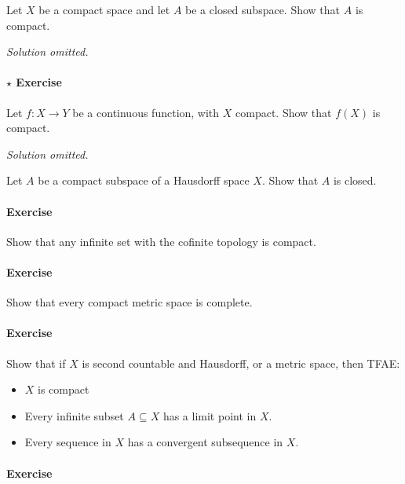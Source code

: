 Let \(X\) be a compact space and let \(A\) be a closed subspace. Show
that \(A\) is compact.

\emph{Solution omitted.}

\hypertarget{star-exercise-1}{%
\paragraph{\texorpdfstring{\(\star\)
Exercise}{\textbackslash star Exercise}}\label{star-exercise-1}}

Let \(f : X \to Y\) be a continuous function, with \(X\) compact. Show
that \(f(X)\) is compact.

\emph{Solution omitted.}

Let \(A\) be a compact subspace of a Hausdorff space \(X\). Show that
\(A\) is closed.

\hypertarget{exercise-13}{%
\paragraph{Exercise}\label{exercise-13}}

Show that any infinite set with the cofinite topology is compact.

\hypertarget{exercise-14}{%
\paragraph{Exercise}\label{exercise-14}}

Show that every compact metric space is complete.

\hypertarget{exercise-15}{%
\paragraph{Exercise}\label{exercise-15}}

Show that if \(X\) is second countable and Hausdorff, or a metric space,
then TFAE:

\begin{itemize}
\tightlist
\item
  \(X\) is compact
\item
  Every infinite subset \(A\subseteq X\) has a limit point in \(X\).
\item
  Every sequence in \(X\) has a convergent subsequence in \(X\).
\end{itemize}

\hypertarget{exercise-16}{%
\paragraph{Exercise}\label{exercise-16}}

